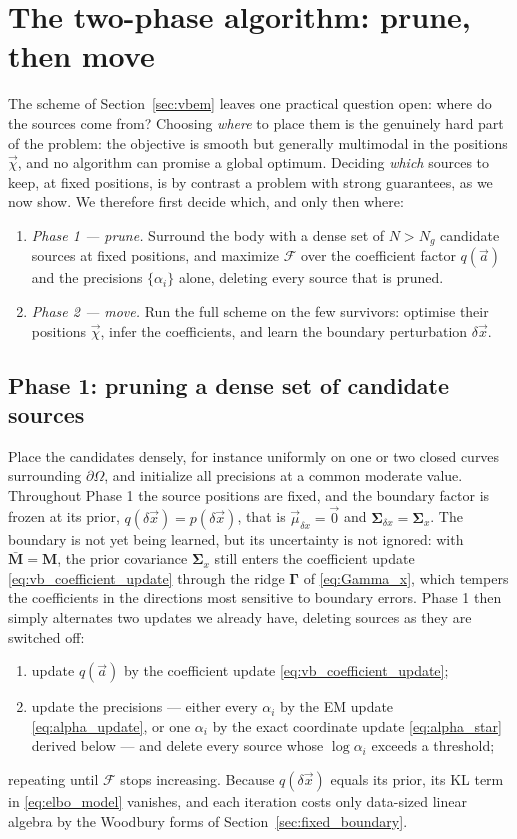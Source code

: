 \documentclass{article}
\begin{document}
\section{The two-phase algorithm: prune, then move} \label{sec:twophase}
The scheme of Section~\ref{sec:vbem} leaves one practical question open: where do the sources come from? Choosing \emph{where} to place them is the genuinely hard part of the problem: the objective is smooth but generally multimodal in the positions $\vec\chi$, and no algorithm can promise a global optimum. Deciding \emph{which} sources to keep, at fixed positions, is by contrast a problem with strong guarantees, as we now show. We therefore first decide which, and only then where:
\begin{enumerate}
    \item \emph{Phase 1 --- prune.} Surround the body with a dense set of $N > N_g$ candidate sources at fixed positions, and maximize $\mathcal F$ over the coefficient factor $q(\vec a)$ and the precisions $\{\alpha_i\}$ alone, deleting every source that is pruned.
    \item \emph{Phase 2 --- move.} Run the full scheme on the few survivors: optimise their positions $\vec\chi$, infer the coefficients, and learn the boundary perturbation $\delta\vec x$.
\end{enumerate}

\subsection{Phase 1: pruning a dense set of candidate sources} \label{sec:phase1}
Place the candidates densely, for instance uniformly on one or two closed curves surrounding $\partial\Omega$, and initialize all precisions at a common moderate value. Throughout Phase 1 the source positions are fixed, and the boundary factor is frozen at its prior, $q(\delta\vec x) = p(\delta\vec x)$, that is $\vec\mu_{\delta x} = \vec 0$ and $\mathbf{\Sigma}_{\delta x} = \mathbf{\Sigma}_x$. The boundary is not yet being learned, but its uncertainty is not ignored: with $\bar{\mathbf M} = \mathbf M$, the prior covariance $\mathbf{\Sigma}_x$ still enters the coefficient update \eqref{eq:vb_coefficient_update} through the ridge $\mathbf\Gamma$ of \eqref{eq:Gamma_x}, which tempers the coefficients in the directions most sensitive to boundary errors. Phase 1 then simply alternates two updates we already have, deleting sources as they are switched off:
\begin{enumerate}
    \item update $q(\vec a)$ by the coefficient update \eqref{eq:vb_coefficient_update};
    \item update the precisions --- either every $\alpha_i$ by the EM update \eqref{eq:alpha_update}, or one $\alpha_i$ by the exact coordinate update \eqref{eq:alpha_star} derived below --- and delete every source whose $\log\alpha_i$ exceeds a threshold;
\end{enumerate}
repeating until $\mathcal F$ stops increasing. Because $q(\delta\vec x)$ equals its prior, its KL term in \eqref{eq:elbo_model} vanishes, and each iteration costs only data-sized linear algebra by the Woodbury forms of Section~\ref{sec:fixed_boundary}.
\end{document}

